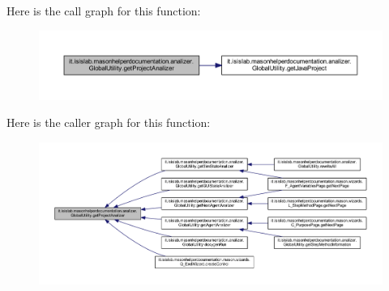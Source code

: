 Here is the call graph for this function\-:\nopagebreak
\begin{figure}[H]
\begin{center}
\leavevmode
\includegraphics[width=350pt]{classit_1_1isislab_1_1masonhelperdocumentation_1_1analizer_1_1_global_utility_af6bcca0c06ec6fa8c2b2b88f5050914c_cgraph}
\end{center}
\end{figure}




Here is the caller graph for this function\-:
\nopagebreak
\begin{figure}[H]
\begin{center}
\leavevmode
\includegraphics[width=350pt]{classit_1_1isislab_1_1masonhelperdocumentation_1_1analizer_1_1_global_utility_af6bcca0c06ec6fa8c2b2b88f5050914c_icgraph}
\end{center}
\end{figure}


